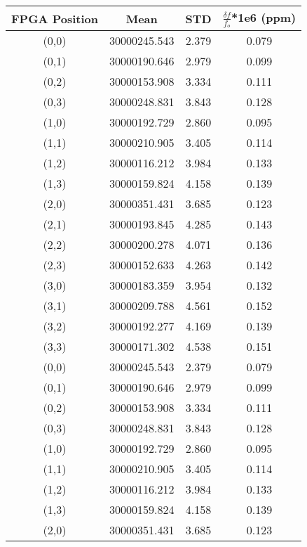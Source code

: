 \begin{table}
	\begin{center}
		\begin{tabular}{|c|c|c|c|}
			\hline
			FPGA Position & Mean & STD & $\frac{\delta f}{f_{o}}$*1e6 (ppm) \\
			\hline
			(0,0) & 30000245.543 & 2.379 & 0.079 \\
			\hline
			(0,1) & 30000190.646 & 2.979 & 0.099 \\
			\hline
			(0,2) & 30000153.908 & 3.334 & 0.111 \\
			\hline
			(0,3) & 30000248.831 & 3.843 & 0.128 \\
			\hline
			(1,0) & 30000192.729 & 2.860 & 0.095 \\
			\hline
			(1,1) & 30000210.905 & 3.405 & 0.114 \\
			\hline
			(1,2) & 30000116.212 & 3.984 & 0.133 \\
			\hline
			(1,3) & 30000159.824 & 4.158 & 0.139 \\
			\hline
			(2,0) & 30000351.431 & 3.685 & 0.123 \\
			\hline
			(2,1) & 30000193.845 & 4.285 & 0.143 \\
			\hline
			(2,2) & 30000200.278 & 4.071 & 0.136 \\
			\hline
			(2,3) & 30000152.633 & 4.263 & 0.142 \\
			\hline
			(3,0) & 30000183.359 & 3.954 & 0.132 \\
			\hline
			(3,1) & 30000209.788 & 4.561 & 0.152 \\
			\hline
			(3,2) & 30000192.277 & 4.169 & 0.139 \\
			\hline
			(3,3) & 30000171.302 & 4.538 & 0.151 \\
			\hline
			(0,0) & 30000245.543 & 2.379 & 0.079 \\
			\hline
			(0,1) & 30000190.646 & 2.979 & 0.099 \\
			\hline
			(0,2) & 30000153.908 & 3.334 & 0.111 \\
			\hline
			(0,3) & 30000248.831 & 3.843 & 0.128 \\
			\hline
			(1,0) & 30000192.729 & 2.860 & 0.095 \\
			\hline
			(1,1) & 30000210.905 & 3.405 & 0.114 \\
			\hline
			(1,2) & 30000116.212 & 3.984 & 0.133 \\
			\hline
			(1,3) & 30000159.824 & 4.158 & 0.139 \\
			\hline
			(2,0) & 30000351.431 & 3.685 & 0.123 \\

\end{tabular}
\end{center}
\end{table}
